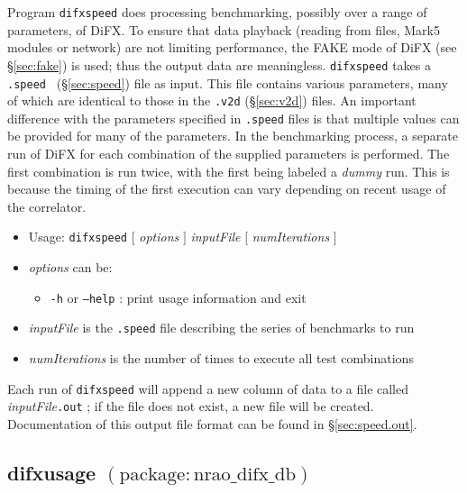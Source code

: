 Program {\tt difxspeed} does processing benchmarking, possibly over a range of parameters, of DiFX.
To ensure that data playback (reading from files, Mark5 modules or network) are not limiting performance, the FAKE mode of DiFX (see \S\ref{sec:fake}) is used; thus the output data are meaningless.
{\tt difxspeed} takes a {\tt .speed } (\S\ref{sec:speed}) file as input.
This file contains various parameters, many of which are identical to those in the {\tt .v2d} (\S\ref{sec:v2d}) files.
An important difference with the parameters specified in {\tt .speed} files is that multiple values can be provided for many of the parameters.
In the benchmarking process, a separate run of DiFX for each combination of the supplied parameters is performed.
The first combination is run twice, with the first being labeled a {\em dummy} run.
This is because the timing of the first execution can vary depending on recent usage of the correlator.

\begin{itemize}
\item[] Usage: {\tt difxspeed} $[$ {\em options} $]$ {\em inputFile} $[$ {\em numIterations} $]$
\item[] {\em options} can be:
\begin{itemize}
\item[] {\tt -h} or {\tt --help} : print usage information and exit
\end{itemize}
\item[] {\em inputFile} is the {\tt .speed} file describing the series of benchmarks to run
\item[] {\em numIterations} is the number of times to execute all test combinations
\end{itemize}

Each run of {\tt difxspeed} will append a new column of data to a file called {\em inputFile}{\tt .out} ; if the file does not exist, a new file will be created.
Documentation of this output file format can be found in \S\ref{sec:speed.out}.








\subsection{difxusage {\small $\mathrm{(package: nrao\_difx\_db)}$}} \label{sec:difxusage}

